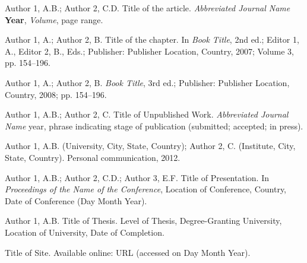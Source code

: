 \documentclass[11pt,a4paper]{article}
\theoremstyle{plain}
\theoremstyle{definition}
\begin{document}
\begin{enumerate}[label={[\arabic*]}, leftmargin=2.5em]
    \item Author 1, A.B.; Author 2, C.D. Title of the article. \textit{Abbreviated Journal Name} \textbf{Year}, \textit{Volume}, page range.
    \item Author 1, A.; Author 2, B. Title of the chapter. In \textit{Book Title}, 2nd ed.; Editor 1, A., Editor 2, B., Eds.; Publisher: Publisher Location, Country, 2007; Volume 3, pp. 154--196.
    \item Author 1, A.; Author 2, B. \textit{Book Title}, 3rd ed.; Publisher: Publisher Location, Country, 2008; pp. 154--196.
    \item Author 1, A.B.; Author 2, C. Title of Unpublished Work. \textit{Abbreviated Journal Name} year, phrase indicating stage of publication (submitted; accepted; in press).
    \item Author 1, A.B. (University, City, State, Country); Author 2, C. (Institute, City, State, Country). Personal communication, 2012.
    \item Author 1, A.B.; Author 2, C.D.; Author 3, E.F. Title of Presentation. In \textit{Proceedings of the Name of the Conference}, Location of Conference, Country, Date of Conference (Day Month Year).
    \item Author 1, A.B. Title of Thesis. Level of Thesis, Degree-Granting University, Location of University, Date of Completion.
    \item Title of Site. Available online: URL (accessed on Day Month Year).
\end{enumerate}

\vspace{2em}

\end{document}
